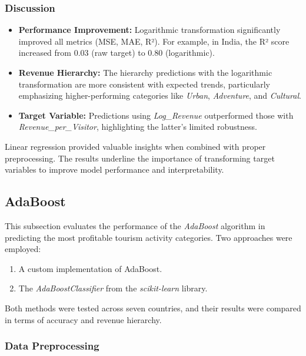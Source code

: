 \documentclass{article}
\begin{document}
\subsubsection{Discussion}
\begin{itemize}
    \item \textbf{Performance Improvement:} Logarithmic transformation significantly improved all metrics (MSE, MAE, R²). For example, in India, the R² score increased from 0.03 (raw target) to 0.80 (logarithmic).
    \item \textbf{Revenue Hierarchy:} The hierarchy predictions with the logarithmic transformation are more consistent with expected trends, particularly emphasizing higher-performing categories like \textit{Urban}, \textit{Adventure}, and \textit{Cultural}.
    \item \textbf{Target Variable:} Predictions using \textit{Log\_Revenue} outperformed those with \textit{Revenue\_per\_Visitor}, highlighting the latter’s limited robustness.
\end{itemize}

Linear regression provided valuable insights when combined with proper preprocessing. The results underline the importance of transforming target variables to improve model performance and interpretability.


\subsection{AdaBoost}

This subsection evaluates the performance of the \textit{AdaBoost} algorithm in predicting the most profitable tourism activity categories. Two approaches were employed:
\begin{enumerate}
    \item A custom implementation of AdaBoost.
    \item The \textit{AdaBoostClassifier} from the \textit{scikit-learn} library.
\end{enumerate}
Both methods were tested across seven countries, and their results were compared in terms of accuracy and revenue hierarchy.

\subsubsection{Data Preprocessing}
\end{document}
